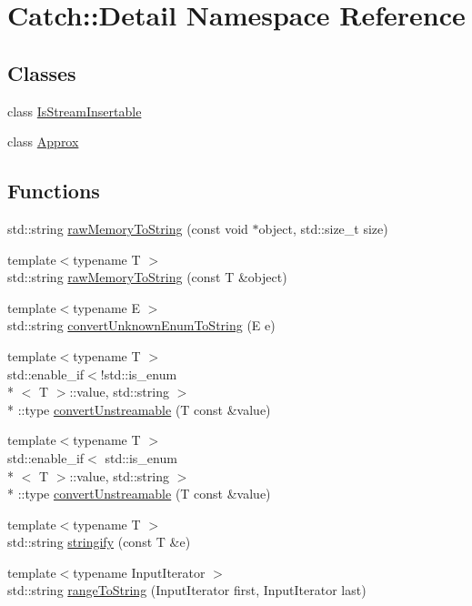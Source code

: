 \hypertarget{namespace_catch_1_1_detail}{\section{Catch\-:\-:Detail Namespace Reference}
\label{namespace_catch_1_1_detail}
}
\subsection*{Classes}
\begin{DoxyCompactItemize}
\item 
class \hyperlink{class_catch_1_1_detail_1_1_is_stream_insertable}{Is\-Stream\-Insertable}
\item 
class \hyperlink{class_catch_1_1_detail_1_1_approx}{Approx}
\end{DoxyCompactItemize}
\subsection*{Functions}
\begin{DoxyCompactItemize}
\item 
std\-::string \hyperlink{namespace_catch_1_1_detail_ac5d6c510e565ee5bddcc2236194ce29e}{raw\-Memory\-To\-String} (const void $\ast$object, std\-::size\-\_\-t size)
\item 
{\footnotesize template$<$typename T $>$ }\\std\-::string \hyperlink{namespace_catch_1_1_detail_a371620ed524abfcae5c3772bf49b563a}{raw\-Memory\-To\-String} (const T \&object)
\item 
{\footnotesize template$<$typename E $>$ }\\std\-::string \hyperlink{namespace_catch_1_1_detail_a242396de537c5176710d680cc9ca6b93}{convert\-Unknown\-Enum\-To\-String} (E e)
\item 
{\footnotesize template$<$typename T $>$ }\\std\-::enable\-\_\-if$<$!std\-::is\-\_\-enum\\*
$<$ T $>$\-::value, std\-::string $>$\\*
\-::type \hyperlink{namespace_catch_1_1_detail_accc3d481dbb5356a8c2c04338b511ee1}{convert\-Unstreamable} (T const \&value)
\item 
{\footnotesize template$<$typename T $>$ }\\std\-::enable\-\_\-if$<$ std\-::is\-\_\-enum\\*
$<$ T $>$\-::value, std\-::string $>$\\*
\-::type \hyperlink{namespace_catch_1_1_detail_abf38276f70bd8b4d9ffe61c6e042304b}{convert\-Unstreamable} (T const \&value)
\item 
{\footnotesize template$<$typename T $>$ }\\std\-::string \hyperlink{namespace_catch_1_1_detail_af0ad48344ffd3f92f3568465248a9880}{stringify} (const T \&e)
\item 
{\footnotesize template$<$typename Input\-Iterator $>$ }\\std\-::string \hyperlink{namespace_catch_1_1_detail_a6650a1dff325bf29962ff15ae73fd972}{range\-To\-String} (Input\-Iterator first, Input\-Iterator last)
\end{DoxyCompactItemize}
